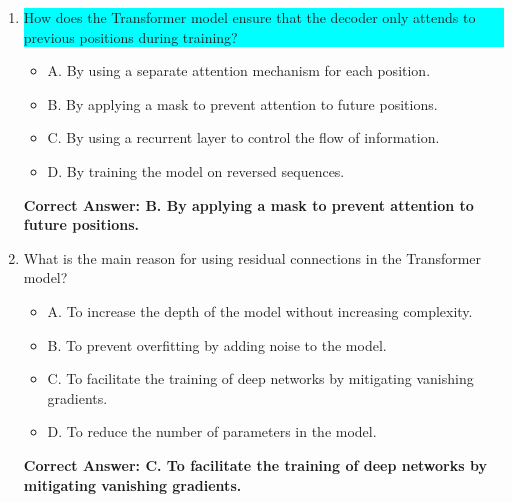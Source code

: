 \begin{figure*}
\begin{tcolorbox}[width=\textwidth,fontupper=\footnotesize,title=Repeated Baseline Questions]
\begin{enumerate}
    \item \colorbox{cyan}{\parbox{0.93\textwidth}{How does the Transformer model ensure that the decoder only attends to previous positions during training?}}
    \begin{itemize}
        \item A. By using a separate attention mechanism for each position.
        \item B. By applying a mask to prevent attention to future positions.
        \item C. By using a recurrent layer to control the flow of information.
        \item D. By training the model on reversed sequences.
    \end{itemize}
    \textbf{Correct Answer: B. By applying a mask to prevent attention to future positions.}

    \item What is the main reason for using residual connections in the Transformer model?
    \begin{itemize}
        \item A. To increase the depth of the model without increasing complexity.
        \item B. To prevent overfitting by adding noise to the model.
        \item C. To facilitate the training of deep networks by mitigating vanishing gradients.
        \item D. To reduce the number of parameters in the model.
    \end{itemize}
    \textbf{Correct Answer: C. To facilitate the training of deep networks by mitigating vanishing gradients.}
\end{enumerate}
\end{tcolorbox}
\end{figure*}

